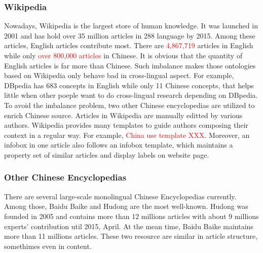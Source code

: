 \documentclass[runningheads,a4paper]{llncs}
\begin{document}
\subsubsection{Wikipedia}
Nowadays, Wikipedia is the largest store of human knowledge. It was launched in 2001 and has hold over 35 million articles in 288 language by 2015. Among these articles, English articles contribute most. There are \textcolor{red}{4,867,719} articles in English while only \textcolor{red}{over 800,000 articles} in Chinese. It is obvious that the quantity of English articles is far more than Chinese. Such imbalance makes those ontologies based on Wikipedia only behave bad in cross-lingual aspect. For example, DBpedia has 683 concepts in English while only 11 Chinese concepts, that helps little when other poeple want to do cross-lingual research depending on DBpedia. To avoid the imbalance problem, two other Chinese encyclopedias are utilized to enrich Chinese source.
Articles in Wikipedia are manually editted by various authors. Wikipedia provides many templates to guide authors composing their context in a regular way. For example, \textcolor{red}{China use template XXX}. Moreover, an infobox in one article also follows an infobox template, which maintains a property set of similar articles and display labels on website page.
\subsubsection{Other Chinese Encyclopedias}
There are several large-scale monolingual Chinese Encyclopedias currently. Among those, Baidu Baike and Hudong are the most well-known. Hudong was founded in 2005 and contains more than 12 millions articles with about 9 millions experts' contribution util 2015, April. At the mean time, Baidu Baike maintains more than 11 millions articles. These two resource are similar in article structure, somethimes even in content. 
\end{document}
